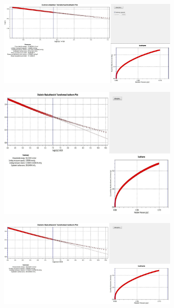\begin{figure}[H]
	\centering
	\includegraphics[width=0.8\textwidth]{media/chem2/image104}
	\caption*{}
\end{figure}

\begin{figure}[H]
	\centering
	\includegraphics[width=0.8\textwidth]{media/chem2/image105}
	\caption*{}
\end{figure}

\begin{figure}[H]
	\centering
	\includegraphics[width=0.8\textwidth]{media/chem2/image106}
	\caption*{}
\end{figure}
 \\

